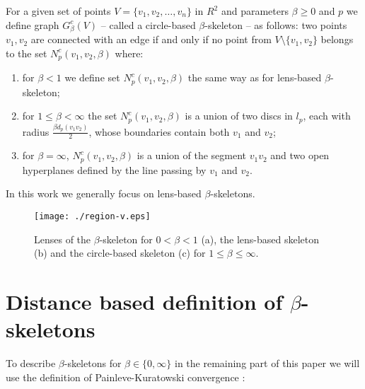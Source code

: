 \documentclass[11pt]{llncs}
\begin{document}
\begin{definition} \cite{e02}
For a given set of points  $V=\{v_1, v_2, \dots , v_n\}$ in $R^2$ and parameters 
$\beta \geq 0$ and $p$ we define graph 
$G^c_{\beta}(V)$ -- called a circle-based $\beta$-skeleton -- as follows:  
two points $v_1, v_2$ are connected with an edge if and only if no point 
from $V \setminus \{v_1, v_2\}$ belongs to the set 
$N^c_{p}(v_1, v_2,\beta)$ where:
\begin{enumerate}
\item
for $\beta <1$ we define set $N^c_p(v_1,v_2,\beta)$ the same way as for lens-based $\beta$-skeleton;
\item
for $1 \leq \beta<\infty$ the set $N^c_{p}(v_1,v_2,\beta)$ is a union of two discs in $l_p$, 
each with radius $\frac{\beta d_p(v_1v_2)}{2}$, whose boundaries contain both $v_1$ and $v_2$;
\item
for $\beta=\infty$, $N^c_{p}(v_1,v_2,\beta)$ is a union of the segment $v_1v_2$ and two open 
hyperplanes defined by the line passing by $v_1$ and $v_2$.
\end{enumerate} 
\end{definition}

In this work we generally focus on lens-based $\beta$-skeletons.\\ 

\begin{figure}[htbp]
\centering
\texttt{[image: ./region-v.eps]}
\caption{Lenses of the $\beta$-skeleton for $0 < \beta <1$ (a), the lens-based skeleton 
(b) and the circle-based skeleton (c) for $1 \leq \beta \leq \infty$.}
\label{fig:region}
\end{figure}








\section{Distance based definition of $\beta$-skeletons }
\label{distancebased}



To describe $\beta$-skeletons for $\beta \in \{0, \infty\}$ in the remaining part of this paper 
we will use the definition of Painleve-Kuratowski convergence \cite{k66}: 
\end{document}
